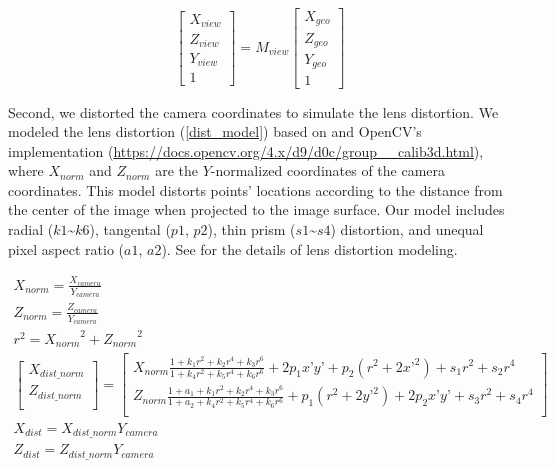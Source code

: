 \documentclass{article}
\begin{document}
\label{view_tf}
\begin{equation}
  \begin{bmatrix} 
    X_{view} \\ Z_{view} \\ Y_{view} \\ 1 
  \end{bmatrix}
  =
  M_{view}
  \begin{bmatrix} 
    X_{geo} \\ Z_{geo} \\ Y_{geo} \\ 1 
  \end{bmatrix}
\end{equation}

Second, we distorted the camera coordinates to simulate the lens distortion. We modeled the lens distortion (\ref{dist_model}) based on \cite{Weng1992CameraCalib} and OpenCV's implementation (\url{https://docs.opencv.org/4.x/d9/d0c/group__calib3d.html}), where \(X_{norm}\) and \(Z_{norm}\) are the \(Y\)-normalized coordinates of the camera coordinates. This model distorts points' locations according to the distance from the center of the image when projected to the image surface. Our model includes radial (\(k1\)\textasciitilde{}\(k6\)), tangental (\(p1\), \(p2\)), thin prism (\(s1\)\textasciitilde{}\(s4\)) distortion, and unequal pixel aspect ratio (\(a1\), \(a2\)). See \cite{Weng1992CameraCalib} for the details of lens distortion modeling.

\label{dist_model}
\begin{gather}
  X_{norm} = \frac{X_{camera}}{Y_{camera}} \\
  Z_{norm} = \frac{Z_{camera}}{Y_{camera}} \\
  r^2 = {X_{norm}}^2 + {Z_{norm}}^2 \\
  \begin{bmatrix}
    X_{dist\_norm} \\ 
    Z_{dist\_norm} \\
  \end{bmatrix} 
  = 
  \begin{bmatrix} 
    X_{norm} \frac{1 + k_1 r^2 + k_2 r^4 + k_3 r^6}{1 + k_4 r^2 + k_5 r^4 + k_6 r^6} + 2 p_1 x’ y’ + p_2(r^2 + 2 x’^2) + s_1 r^2 + s_2 r^4 \\ 
    Z_{norm} \frac{1 + a_1 + k_1 r^2 + k_2 r^4 + k_3 r^6}{1 + a_2 + k_4 r^2 + k_5 r^4 + k_6 r^6} + p_1 (r^2 + 2 y’^2) + 2 p_2 x’ y’ + s_3 r^2 + s_4 r^4 \\    \end{bmatrix} \\
  X_{dist} = X_{dist\_norm} Y_{camera} \\
  Z_{dist} = Z_{dist\_norm} Y_{camera} \\
\end{gather}
\end{document}

